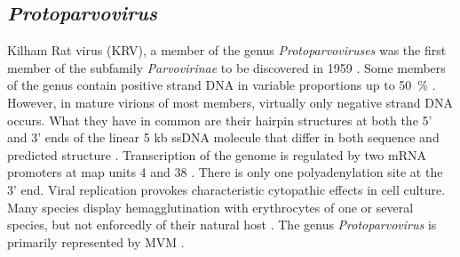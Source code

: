 

\subsection{\textit{Protoparvovirus}}
Kilham Rat virus (KRV), a member of the genus \textit{Protoparvoviruses} was the first member of the subfamily \textit{Parvovirinae} to be discovered in 1959 \cite{pmid13669314}. Some members of the genus contain positive strand DNA in variable proportions up to 50~\% \cite{pmid6694260}. However, in mature virions of most members, virtually only negative strand DNA occurs. What they have in common are their hairpin structures at both the 5’ and 3’ ends of the linear 5 kb ssDNA molecule that differ in both sequence and predicted structure \cite{pmid6298737}. Transcription of the genome is regulated by two mRNA promoters at map units 4 and 38 \cite{pmid6828378}. There is only one polyadenylation site at the 3’ end. 
Viral replication provokes characteristic cytopathic effects in cell culture. Many species display hemagglutination with erythrocytes of one or several species, but not enforcedly of their natural host \cite{pmid5083410}. The genus \textit{Protoparvovirus} is primarily represented by MVM \cite{icvt, protoparvovirus}.       


